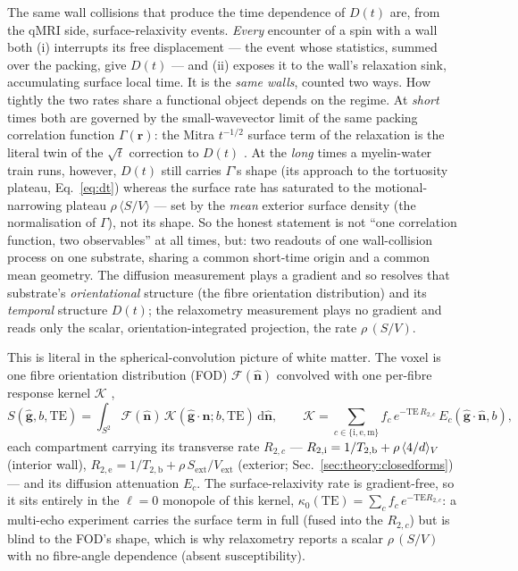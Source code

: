 The same wall collisions that produce the time dependence of $D(t)$ are, from the
qMRI side, surface-relaxivity events. \emph{Every} encounter of a spin with a wall
both (i) interrupts its free displacement --- the event whose statistics, summed
over the packing, give $D(t)$ --- and (ii) exposes it to the wall's relaxation
sink, accumulating surface local time. It is the \emph{same walls}, counted two
ways. How tightly the two rates share a functional object depends on the regime. At
\emph{short} times both are governed by the small-wavevector limit of the same packing
correlation function $\Gamma(\mathbf r)$: the Mitra $t^{-1/2}$ surface term of the
relaxation is the literal twin of the $\sqrt{t}$ correction to $D(t)$
\citep{Mitra1992, NovikovKiselev2010}. At the \emph{long} times a myelin-water train runs,
however, $D(t)$ still carries $\Gamma$'s shape (its approach to the tortuosity plateau,
Eq.~\eqref{eq:dt}) whereas the surface rate has saturated to the motional-narrowing
plateau $\rho\,\langle S/V\rangle$ --- set by the \emph{mean} exterior surface density
(the normalisation of $\Gamma$), not its shape. So the honest statement is not ``one
correlation function, two observables'' at all times, but: two readouts of one
wall-collision process on one substrate, sharing a common short-time origin and a common
mean geometry. The diffusion measurement plays a gradient and so resolves that
substrate's \emph{orientational} structure (the fibre orientation distribution) and its
\emph{temporal} structure $D(t)$; the relaxometry measurement plays no gradient and reads
only the scalar, orientation-integrated projection, the rate $\rho\,(S/V)$.

This is literal in the spherical-convolution picture of white matter. The voxel is
one fibre orientation distribution (FOD) $\mathcal F(\hat{\mathbf n})$ convolved with
one per-fibre response kernel $\mathcal K$ \citep{tournier2007},
\begin{equation}
  S(\hat{\mathbf g},b,\mathrm{TE})=\int_{S^2}\mathcal F(\hat{\mathbf n})\,
  \mathcal K(\hat{\mathbf g}\!\cdot\!\hat{\mathbf n};b,\mathrm{TE})\,\mathrm d\hat{\mathbf n},
  \qquad
  \mathcal K=\!\!\sum_{c\in\{\mathrm i,\mathrm e,\mathrm m\}}\!\! f_c\,
  e^{-\mathrm{TE}\,R_{2,c}}\,E_c(\hat{\mathbf g}\!\cdot\!\hat{\mathbf n},b),
  \label{eq:fod_conv}
\end{equation}
each compartment carrying its transverse rate $R_{2,c}$ ---
$R_{2,\mathrm i}=1/T_{2,\mathrm b}+\rho\,\langle 4/d\rangle_{V}$ (interior wall),
$R_{2,\mathrm e}=1/T_{2,\mathrm b}+\rho\,S_{\mathrm{ext}}/V_{\mathrm{ext}}$ (exterior;
Sec.~\ref{sec:theory:closedforms}) --- and its diffusion attenuation $E_c$. The
surface-relaxivity rate is gradient-free, so it sits entirely in the $\ell=0$ monopole of
this kernel, $\kappa_0(\mathrm{TE})=\sum_c f_c\,e^{-\mathrm{TE}R_{2,c}}$: a multi-echo
experiment carries the surface term in full (fused into the $R_{2,c}$) but is blind to
the FOD's shape, which is why relaxometry reports a scalar $\rho\,(S/V)$ with no
fibre-angle dependence (absent susceptibility).


